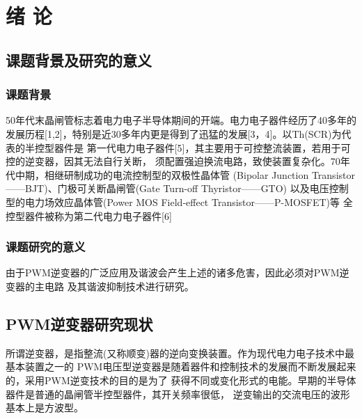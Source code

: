 \clearpage
{} %
    \section{绪 \hspace{0.5em} 论}

    \subsection{课题背景及研究的意义}

    \subsubsection{课题背景}

    50年代末晶闸管标志着电力电子半导体期间的开端。电力电子器件经历了40多年的
    发展历程[1,2]，特别是近30多年内更是得到了迅猛的发展[3，4]。以Th(SCR)为代表的半控型器件是
    第一代电力电子器件[5]，其主要用于可控整流装置，若用于可控的逆变器，因其无法自行关断，
    须配置强迫换流电路，致使装置复杂化。70年代中期，相继研制成功的电流控制型的双极性晶体管
    (Bipolar Junction Transistor——BJT)、门极可关断晶闸管(Gate Turn-off Thyristor——GTO)
    以及电压控制型的电力场效应晶体管(Power MOS Field-effect Transistor——P-MOSFET)等
    全控型器件被称为第二代电力电子器件[6]%

    \subsubsection{课题研究的意义}

    由于PWM逆变器的广泛应用及谐波会产生上述的诸多危害，因此必须对PWM逆变器的主电路
    及其谐波抑制技术进行研究。

    \subsection{PWM逆变器研究现状}

    所谓逆变器，是指整流(又称顺变)器的逆向变换装置。作为现代电力电子技术中最基本装置之一的
    PWM电压型逆变器是随着器件和控制技术的发展而不断发展起来的，采用PWM逆变技术的目的是为了
    获得不同或变化形式的电能。早期的半导体器件是普通的晶闸管半控型器件，其开关频率很低，
    逆变输出的交流电压的波形基本上是方波型。


